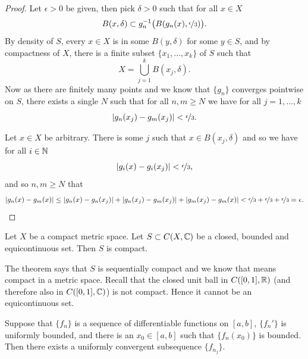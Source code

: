 \begin{proof}
Let $\epsilon > 0$ be given, then pick $\delta > 0$
such that for all $x \in X$
\begin{equation*}
B(x,\delta) \subset g_n^{-1}\bigl(B(g_n(x),\nicefrac{\epsilon}{3})\bigr).
\end{equation*}
By density of $S$, every $x \in X$ is in some $B(y,\delta)$
for some $y \in S$, and by compactness of $X$,
there is a finite subset $\{ x_1,\ldots,x_k \}$ of $S$
such that
\begin{equation*}
X = \bigcup_{j=1}^k B(x_j,\delta) .
\end{equation*}
Now as there are finitely many points and we know that $\{ g_n \}$
converges pointwise on $S$, there exists a single $N$ such that for 
all $n,m \geq N$ we have for all $j=1,\ldots,k$
\begin{equation*}
\lvert {g_n(x_j)-g_m(x_j)} \rvert < \nicefrac{\epsilon}{3} .
\end{equation*}

Let $x \in X$ be arbitrary.  There is some $j$ such that
$x \in B(x_j,\delta)$ and so we have for all $i \in {\mathbb{N}}$
\begin{equation*}
\lvert {g_i(x)-g_i(x_j)} \rvert < \nicefrac{\epsilon}{3},
\end{equation*}
and so $n,m \geq N$ that
\begin{equation*}
\lvert {g_n(x)-g_m(x)} \rvert \leq
\lvert {g_n(x)-g_n(x_j)} \rvert +
\lvert {g_n(x_j)-g_m(x_j)} \rvert +
\lvert {g_m(x_j)-g_m(x)} \rvert <
\nicefrac{\epsilon}{3} +
\nicefrac{\epsilon}{3} +
\nicefrac{\epsilon}{3} = \epsilon . \qedhere
\end{equation*}
\end{proof}

\begin{cor}
Let $X$ be a compact metric space.
Let $S \subset C(X,{\mathbb{C}})$ be a closed, bounded and equicontinuous set.
Then $S$ is compact.
\end{cor}

The theorem says that $S$
is sequentially compact and we know that means
compact in a metric space.
Recall that the closed unit ball in $C([0,1],{\mathbb{R}})$ (and therefore also in
$C([0,1],{\mathbb{C}})$) is not compact.
Hence it cannot be an equicontinuous set.

\begin{cor}
Suppose that $\{ f_n \}$ is a sequence of differentiable functions on $[a,b]$,
$\{ f_n' \}$ is uniformly bounded, and there is an
$x_0 \in [a,b]$ such that $\{ f_n(x_0) \}$ is bounded.
Then there exists a uniformly convergent
subsequence $\{ f_{n_j} \}$.
\end{cor}

